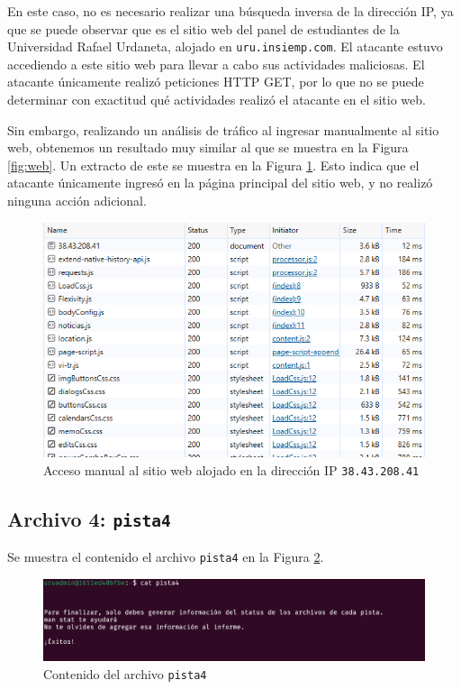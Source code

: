 \documentclass{article}
\begin{document}
En este caso, no es necesario realizar una búsqueda inversa de la dirección IP, ya que se puede observar que es el sitio web del panel de estudiantes de la Universidad Rafael Urdaneta, alojado en \texttt{uru.insiemp.com}. El atacante estuvo accediendo a este sitio web para llevar a cabo sus actividades maliciosas. El atacante únicamente realizó peticiones HTTP GET, por lo que no se puede determinar con exactitud qué actividades realizó el atacante en el sitio web.

Sin embargo, realizando un análisis de tráfico al ingresar manualmente al sitio web, obtenemos un resultado muy similar al que se muestra en la Figura \ref{fig:web}. Un extracto de este se muestra en la Figura \ref{fig:web_manual}. Esto indica que el atacante únicamente ingresó en la página principal del sitio web, y no realizó ninguna acción adicional.

\begin{figure}[ht!]
  \includegraphics[width=\textwidth]{web_manual.png}
  \caption{Acceso manual al sitio web alojado en la dirección IP \texttt{38.43.208.41}}
  \label{fig:web_manual}
\end{figure}

\subsection{Archivo 4: \texttt{pista4}}

Se muestra el contenido el archivo \texttt{pista4} en la Figura \ref{fig:pista4}.

\begin{figure}[ht!]
  \includegraphics[width=\textwidth]{pista4.png}
  \caption{Contenido del archivo \texttt{pista4}}
  \label{fig:pista4}
\end{figure}
\end{document}
